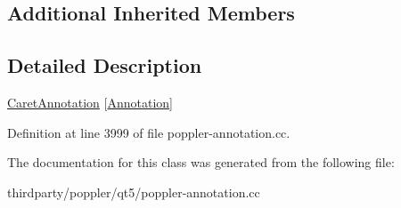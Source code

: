 \subsection*{Additional Inherited Members}


\subsection{Detailed Description}
\hyperlink{class_poppler_1_1_caret_annotation}{Caret\+Annotation} \mbox{[}\hyperlink{class_poppler_1_1_annotation}{Annotation}\mbox{]} 

Definition at line 3999 of file poppler-\/annotation.\+cc.



The documentation for this class was generated from the following file\+:\begin{DoxyCompactItemize}
\item 
thirdparty/poppler/qt5/poppler-\/annotation.\+cc\end{DoxyCompactItemize}
